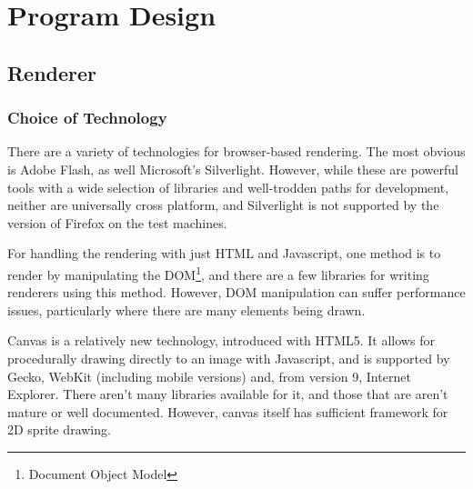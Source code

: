 \documentclass[12pt]{amsart}
\begin{document}
\section{Program Design}
  \subsection{Renderer}
    \subsubsection{Choice of Technology}
      \begin{flushleft}
        There are a variety of technologies for browser-based rendering. The
        most obvious is Adobe Flash, as well Microsoft's Silverlight. However,
        while these are powerful tools with a wide selection of libraries and
        well-trodden paths for development, neither are universally cross
        platform, and Silverlight is not supported by the version of Firefox
        on the test machines.

        For handling the rendering with just HTML and Javascript, one method is
        to render by manipulating the DOM\footnote{Document Object Model}, and
        there are a few libraries for writing renderers using this method.
        However, DOM manipulation can suffer performance issues, particularly
        where there are many elements being drawn.

        Canvas is a relatively new technology, introduced with HTML5. It allows
        for procedurally drawing directly to an image with Javascript, and is
        supported by Gecko, WebKit (including mobile versions) and, from version
        9, Internet Explorer. There aren't many libraries available for it, and
        those that are aren't mature or well documented. However, canvas itself
        has sufficient framework for 2D sprite drawing.
      \end{flushleft}
\end{document}
